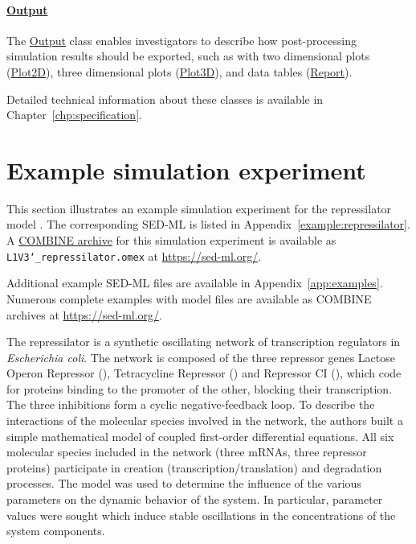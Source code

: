 \paragraph*{\hyperref[class:output]{Output}}
The \hyperref[class:output]{Output} class enables investigators to describe how post-processing simulation results should be exported, such as with two dimensional plots (\hyperref[class:plot2D]{Plot2D}), three dimensional plots (\hyperref[class:plot3D]{Plot3D}), and data tables (\hyperref[class:report]{Report}).

Detailed technical information about these classes is available in Chapter~\ref{chp:specification}. 

\section{Example simulation experiment}
\label{motivation:example}
This section illustrates an example simulation experiment for the repressilator model \citep{Elowitz:2000}. The corresponding SED-ML is listed in Appendix~\ref{example:repressilator}. A \hyperref[sec:archive]{COMBINE archive} for this simulation experiment is available as \texttt{L1V3\char`_repressilator.omex} at \url{https://sed-ml.org/}.

Additional example SED-ML files are available in Appendix~\ref{app:examples}. Numerous complete examples with model files are available as COMBINE archives at \url{https://sed-ml.org/}.

The repressilator is a synthetic oscillating network of transcription regulators in \textit{Escherichia coli}. The network is composed of the three repressor genes Lactose Operon Repressor (), Tetracycline Repressor () and Repressor CI (), which code for proteins binding to the promoter of the other, blocking their transcription. The three inhibitions form a cyclic negative-feedback loop. To describe the interactions of the molecular species involved in the network, the authors built a simple mathematical model of coupled first-order differential equations. All six molecular species included in the network (three mRNAs, three repressor proteins) participate in creation (transcription/translation) and degradation processes. The model was used to determine the influence of the various parameters on the dynamic behavior of the system. In particular, parameter values were sought which induce stable oscillations in the concentrations of the system components.

